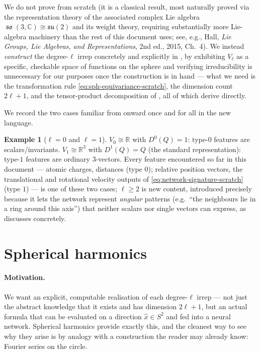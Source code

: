 \documentclass[11pt,a4paper]{report}
\theoremstyle{definition}
\newtheorem{example}[example]{Example}
\theoremstyle{remark}
\DeclareMathOperator{\so}{\mathfrak{so}}
\newcommand{\RR}{\mathbb R}
\newcommand{\CC}{\mathbb C}
\newcommand{\su}{\mathfrak{su}}
\begin{document}
We do not prove  from scratch (it is a
classical result, most naturally proved via the representation theory of
the associated complex Lie algebra $\so(3,\CC)\cong\su(2)$ and its weight
theory, requiring substantially more Lie-algebra machinery than the rest of
this document uses; see, e.g., Hall, \emph{Lie Groups, Lie Algebras, and
Representations}, 2nd ed., 2015, Ch.~4). We instead \emph{construct} the
degree-$\ell$ irrep concretely and explicitly in
, by exhibiting $V_\ell$ as a
specific, checkable space of functions on the sphere and verifying
irreducibility is unnecessary for our purposes once the construction is in
hand --- what we need is the transformation rule
\eqref{eq:sph-equivariance-scratch}, the dimension count $2\ell+1$, and the
tensor-product decomposition of , all of which
 derive directly.

We record the two cases familiar from 
onward once and for all in the new language.

\begin{example}[$\ell=0$ and $\ell=1$]
\label{ex:ell01}
$V_0\cong\RR$ with $D^0(Q)=1$: type-$0$ features are scalars/invariants.
$V_1\cong\RR^3$ with $D^1(Q)=Q$ (the standard representation): type-$1$
features are ordinary $3$-vectors. Every feature encountered so far in this
document --- atomic charges, distances (type $0$); relative position
vectors, the translational and rotational velocity outputs of
\eqref{eq:network-signature-scratch} (type $1$) --- is one of these two
cases; $\ell\ge2$ is new content, introduced precisely because it lets the
network represent \emph{angular} patterns (e.g.\ ``the neighbours lie in a
ring around this axis'') that neither scalars nor single vectors can
express, as  discusses concretely.
\end{example}

\section{Spherical harmonics}
\label{sec:spherical-harmonics-derivation}

\paragraph{Motivation.} We want an explicit, computable realisation of each
degree-$\ell$ irrep --- not just the abstract knowledge that it exists and
has dimension $2\ell+1$, but an actual formula that can be evaluated on a
direction $\hat x\in S^2$ and fed into a neural network. Spherical
harmonics provide exactly this, and the cleanest way to see why they arise
is by analogy with a construction the reader may already know: Fourier
series on the circle.
\end{document}
